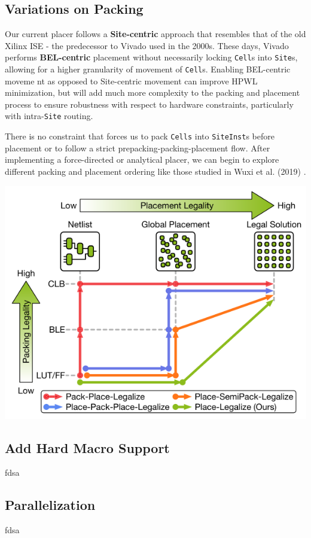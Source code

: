 \subsection{Variations on Packing}
Our current placer follows a \textbf{Site-centric} approach that resembles that of the old Xilinx ISE - the predecessor to Vivado used in the 2000s.
These days, Vivado performs \textbf{BEL-centric} placement without necessarily locking \texttt{Cell}s into \texttt{Site}s, allowing for a higher granularity of movement of \texttt{Cell}s. 
Enabling BEL-centric moveme
nt as opposed to Site-centric movement can improve HPWL minimization, but will add much more complexity to the packing and placement process to ensure robustness with respect to hardware constraints, particularly with intra-\texttt{Site} routing.

There is no constraint that forces us to pack \texttt{Cells} into \texttt{SiteInst}s before placement or to follow a strict prepacking-packing-placement flow. 
After implementing a force-directed or analytical placer, we can begin to explore different packing and placement ordering like those studied in Wuxi et al. (2019) \cite{ExplicitPacking}.

{
    \centering
    \includegraphics[width=\columnwidth]{figures/future_work/legalization.png}
}
\vspace{0.25cm}

\subsection{Add Hard Macro Support}
fdsa

\subsection{Parallelization}
fdsa




